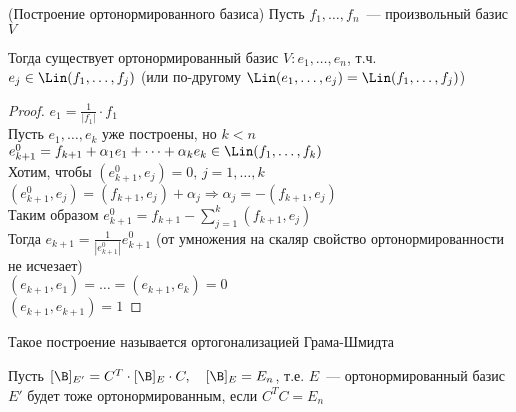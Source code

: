 \begin{theorem}(Построение ортонормированного базиса)
    Пусть $f_1, \dots, f_n$~--- произвольный базис $V$

    Тогда существует ортонормированный базис $V: e_1, \dots, e_n$, т.ч. \\
    $e_j \in \Lin (f_1, \dots, f_j)$ (или по-другому $\Lin (e_1, \dots, e_j) = \Lin (f_1, \dots, f_j)$)

    \begin{proof}
    \emptyln
    $e_1 = \frac{1}{|f_1|} \cdot f_1$ \\

    Пусть $e_1, \dots, e_k$ уже построены, но $k < n$ \\
    
    $e^0_{k + 1} = f_{k + 1} + \alpha_1 e_1 + \dots + \alpha_{k} e_k \in \Lin (f_1, \dots, f_k)$ \\
    Хотим, чтобы $(e^0_{k + 1}, e_j) = 0, \, j = 1, \dots, k$ \\

    $(e^0_{k + 1}, e_j) = (f_{k + 1}, e_j) + \alpha_j \Longrightarrow \alpha_j = - (f_{k + 1}, e_j)$ \\
    Таким образом $e^0_{k + 1} = f_{k + 1} - \sum_{j = 1}^{k} (f_{k + 1}, e_j)$ \\
    Тогда $e_{k + 1} = \frac{1}{|e^0_{k + 1}|} e^0_{k + 1}$ (от умножения на скаляр свойство ортонормированности не исчезает) \\

    $(e_{k + 1}, e_1) = \dots = (e_{k + 1}, e_k) = 0$ \\
    $(e_{k + 1}, e_{k + 1}) = 1$
    \end{proof}
\end{theorem}

\notice Такое построение называется ортогонализацией Грама-Шмидта

\notice Пусть $[\B]_{E'} = C^T \cdot [\B]_E \cdot C, \quad [\B]_E = E_n$, т.е. $E$~--- ортонормированный базис
$E'$ будет тоже ортонормированным, если $C^TC = E_n$